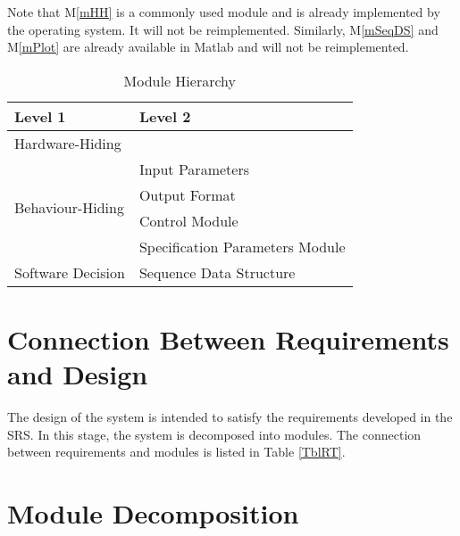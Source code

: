 \documentclass[12pt]{article}
\newcommand{\mref}[1]{M\ref{#1}}
\begin{document}
Note that \mref{mHH} is a commonly used module and is already implemented by the operating
system.  It will not be reimplemented.  Similarly, \mref{mSeqDS} and \mref{mPlot} are already available in Matlab and will not be reimplemented.

\begin{table}[h!]
\centering
\begin{tabular}{p{} p{}}
\toprule
\textbf{Level 1} & \textbf{Level 2}\\
\midrule

{Hardware-Hiding} & ~ \\
\midrule

\multirow{4}{0.3\textwidth}{Behaviour-Hiding} & Input Parameters\\
& Output Format\\
& Control Module\\
& Specification Parameters Module\\
\midrule

\multirow{1}{0.3\textwidth}{Software Decision} & Sequence Data Structure\\
\bottomrule

\end{tabular}
\caption{Module Hierarchy}
\label{TblMH}
\end{table}

\section{Connection Between Requirements and Design} \label{SecConnection}

The design of the system is intended to satisfy the requirements developed in
the SRS. In this stage, the system is decomposed into modules. The connection
between requirements and modules is listed in Table \ref{TblRT}.

\section{Module Decomposition} \label{SecMD}
\end{document}

